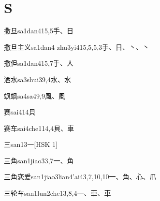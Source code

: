 
\section*{S}

\begin{entry}{撒旦}{sa1dan4}{15,5}{⼿、⽇}
\end{entry}

\begin{entry}{撒旦主义}{sa1dan4 zhu3yi4}{15,5,5,3}{⼿、⽇、⼂、⼂}
\end{entry}

\begin{entry}{撒但}{sa1dan4}{15,7}{⼿、⼈}
\end{entry}

\begin{entry}{洒水}{sa3shui3}{9,4}{⽔、⽔}
\end{entry}

\begin{entry}{飒飒}{sa4sa4}{9,9}{⾵、⾵}
\end{entry}

\begin{entry}{赛}{sai4}{14}{⾙}
\end{entry}

\begin{entry}{赛车}{sai4che1}{14,4}{⾙、⾞}
\end{entry}

\begin{entry}{三}{san1}{3}{⼀}[HSK 1]
\end{entry}

\begin{entry}{三角}{san1jiao3}{3,7}{⼀、⾓}
\end{entry}

\begin{entry}{三角恋爱}{san1jiao3lian4'ai4}{3,7,10,10}{⼀、⾓、⼼、⽖}
\end{entry}

\begin{entry}{三轮车}{san1lun2che1}{3,8,4}{⼀、⾞、⾞}
\end{entry}

